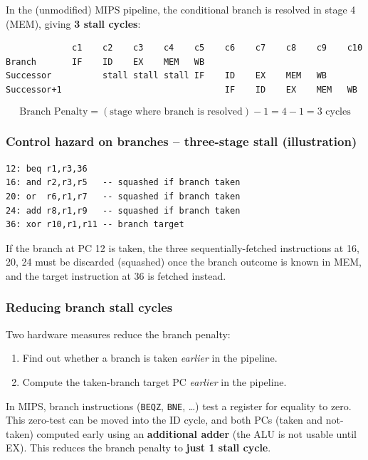 In the (unmodified) MIPS pipeline, the conditional branch is resolved in
stage 4 (MEM), giving \textbf{3 stall cycles}:

\begin{lstlisting}
             c1    c2    c3    c4    c5    c6    c7    c8    c9    c10
Branch       IF    ID    EX    MEM   WB
Successor          stall stall stall IF    ID    EX    MEM   WB
Successor+1                                IF    ID    EX    MEM   WB
\end{lstlisting}
\begin{prop}
\[
  \text{Branch Penalty} = (\text{stage where branch is resolved}) - 1 = 4-1 = 3 \text{ cycles}
\]
\end{prop}

\subsubsection{Control hazard on branches -- three-stage stall (illustration)}

\begin{lstlisting}
12: beq r1,r3,36
16: and r2,r3,r5   -- squashed if branch taken
20: or  r6,r1,r7   -- squashed if branch taken
24: add r8,r1,r9   -- squashed if branch taken
36: xor r10,r1,r11 -- branch target
\end{lstlisting}
If the branch at PC 12 is taken, the three sequentially-fetched instructions
at 16, 20, 24 must be discarded (squashed) once the branch outcome is known
in MEM, and the target instruction at 36 is fetched instead.

\subsubsection{Reducing branch stall cycles}

Two hardware measures reduce the branch penalty:
\begin{enumerate}
  \item Find out whether a branch is taken \emph{earlier} in the pipeline.
  \item Compute the taken-branch target PC \emph{earlier} in the pipeline.
\end{enumerate}

In MIPS, branch instructions (\texttt{BEQZ}, \texttt{BNE}, \dots) test a
register for equality to zero. This zero-test can be moved into the ID
cycle, and both PCs (taken and not-taken) computed early using an
\textbf{additional adder} (the ALU is not usable until EX). This reduces the
branch penalty to \textbf{just 1 stall cycle}.

